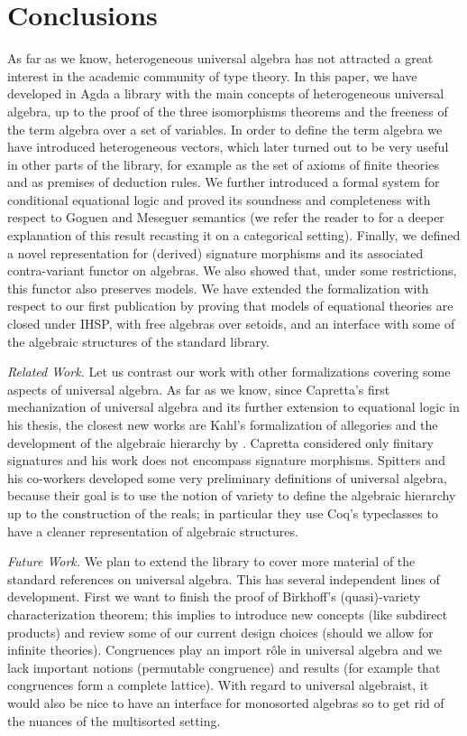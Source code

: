 \section{Conclusions}
\label{sec:conclusions}

As far as we know, heterogeneous universal algebra has not attracted a
great interest in the academic community of type theory. In this
paper, we have developed in Agda a library with the main concepts of
heterogeneous universal algebra, up to the proof of the three
isomorphisms theorems and the freeness of the term algebra over a set
of variables. In order to define the term algebra we have introduced
heterogeneous vectors, which later turned out to be very useful in
other parts of the library, for example as the set of axioms of finite
theories and as premises of deduction rules. We further introduced a
formal system for conditional equational logic and proved its
soundness and completeness with respect to Goguen and Meseguer
semantics (we refer the reader to \cite{vidal-06} for a deeper
explanation of this result recasting it on a categorical setting).
Finally, we defined a novel representation for (derived) signature
morphisms and its associated contra-variant functor on algebras. We
also showed that, under some restrictions, this functor also preserves
models. We have extended the formalization with respect to our first
publication \citep{DBLP:journals/entcs/GuntherGP18} by proving that
models of equational theories are closed under IHSP, with free
algebras over setoids, and an interface with some of the algebraic
structures of the standard library.

\textit{Related Work.} Let us contrast our work with other
formalizations covering some aspects of universal algebra. As far as
we know, since Capretta's \citeyearpar{capretta-99} first mechanization of
universal algebra and its further extension to equational logic in his
thesis, the closest new works are Kahl's \citeyearpar{kahl-2011}
formalization of allegories and the development of the algebraic
hierarchy by \cite{spitters-algebraic-11}. Capretta
considered only finitary signatures and his work does not encompass
signature morphisms. Spitters and his co-workers developed some very
preliminary definitions of universal algebra, because their goal is to
use the notion of variety to define the algebraic hierarchy up to the
construction of the reals; in particular they use Coq's typeclasses to
have a cleaner representation of algebraic structures.


\textit{Future Work.} We plan to extend the library to cover more
material of the standard references on universal algebra. This has
several independent lines of development. First we want to finish the
proof of Birkhoff's (quasi)-variety characterization theorem; this
implies to introduce new concepts (like subdirect products) and review
some of our current design choices (should we allow for infinite
theories). Congruences play an import rôle in universal algebra and we
lack important notions (permutable congruence) and results (for
example that congruences form a complete lattice). With regard to
universal algebraist, it would also be nice to have an interface for
monosorted algebras so to get rid of the nuances of the multisorted
setting.

